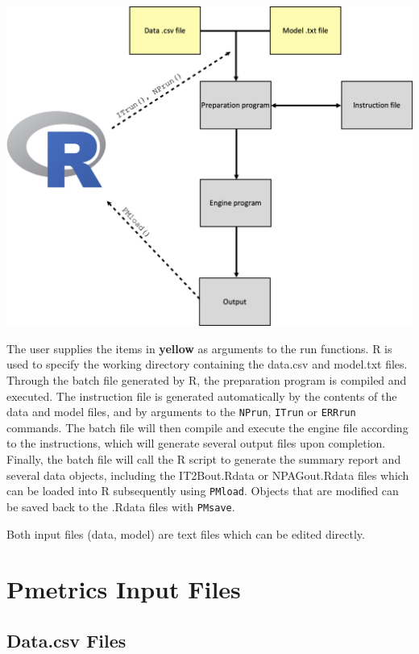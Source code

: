\documentclass[
]{book}
\begin{document}
\includegraphics{Images/Slide2.png}

The user supplies the items in \textbf{yellow} as arguments to
the run functions. R is used to specify the working directory containing the data.csv and
model.txt files. Through the batch file generated by R, the preparation
program is compiled and executed. The instruction file is generated
automatically by the contents of the data and model files, and by
arguments to the \texttt{NPrun}, \texttt{ITrun} or \texttt{ERRrun} commands. The batch file
will then compile and execute the engine file according to the
instructions, which will generate several output files upon completion.
Finally, the batch file will call the R script to generate the summary
report and several data objects, including the IT2Bout.Rdata or
NPAGout.Rdata files which can be loaded into R subsequently using
\texttt{PMload}. Objects that are modified can be saved back to the .Rdata
files with \texttt{PMsave}.

Both input files (data, model) are text files which can be edited
directly.

\hypertarget{pmetrics-input-files}{%
\chapter{Pmetrics Input Files}\label{pmetrics-input-files}}

\hypertarget{data.csv-files}{%
\section{Data.csv Files}\label{data.csv-files}}
\end{document}

